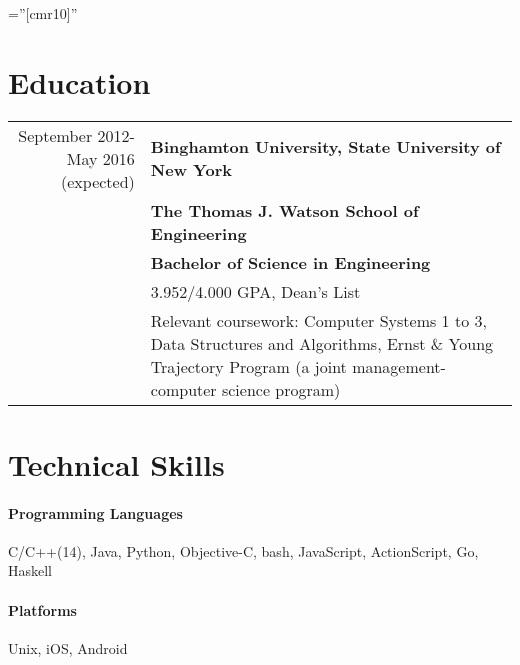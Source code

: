 \documentclass[letterpaper,10pt]{article} %
\begin{document}
\pagestyle{empty} %

\font\fb=''[cmr10]'' %

\par{\par} %
\par{\par}
\par{\par}
\par{\par}

\section{Education}

\begin{longtable}{r|p{4.25in}}	
    September 2012-May 2016 (expected) & \textbf{Binghamton University, State University of New York} \\
    & \textbf{The Thomas J. Watson School of Engineering} \\
    & \textbf{Bachelor of Science in Engineering} \\
    & 3.952/4.000 GPA, Dean's List \\
    & Relevant coursework: Computer Systems 1 to 3, Data Structures and Algorithms,
    Ernst \& Young Trajectory Program {\footnotesize (a joint management-computer science program)} \\
\end{longtable}

\section{Technical Skills}

\paragraph{Programming Languages} C/C++(14), Java, Python, Objective-C, {\footnotesize bash, JavaScript, ActionScript, Go, Haskell}
\paragraph{Platforms} Unix, iOS, Android
\end{document}
